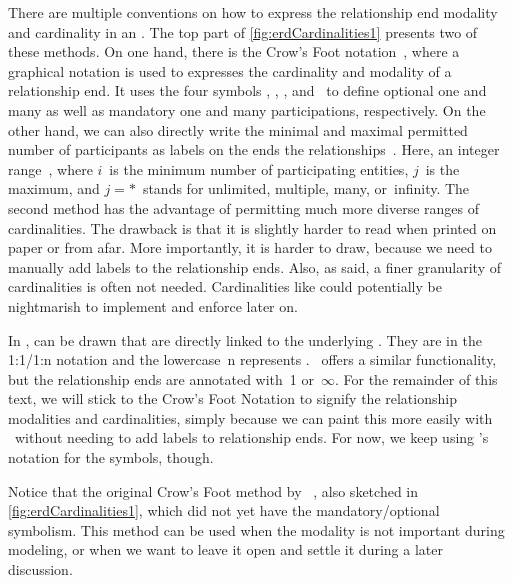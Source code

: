 There are multiple conventions on how to express the relationship end modality and cardinality in an .
The top part of \cref{fig:erdCardinalities1} presents two of these methods.
On one hand, there is the Crow's Foot notation~\cite{E1976BDSMEWACE,CM2000MDMAUDA,S2024D:CDMERDE}, where a graphical notation is used to expresses the cardinality and modality of a relationship end.
It uses the four symbols \crowsFootOptionalOne, \crowsFootOptionalMany, \crowsFootMandatoryOne, and \crowsFootMandatoryMany\ to define optional one and many as well as mandatory one and many participations, respectively.
On the other hand, we can also directly write the minimal and maximal permitted number of participants as labels on the ends the relationships~\cite{P2006CITRD:ERMI}.
Here, an integer range~, where $i$~is the minimum number of participating entities, $j$~is the maximum, and $j=*$~stands for unlimited, multiple, many, or~infinity.
The second method has the advantage of permitting much more diverse ranges of cardinalities.
The drawback is that it is slightly harder to read when printed on paper or from afar.
More importantly, it is harder to draw, because we need to manually add labels to the relationship ends.
Also, as said, a finer granularity of cardinalities is often not needed.
Cardinalities like  could potentially be nightmarish to implement and enforce later on.

In \libreofficeBase,  can be drawn that are directly linked to the underlying \db.
They are in the 1:1/1:n notation and the lowercase~n represents .
\microsoftAccess\ offers a similar functionality, but the relationship ends are annotated with~1 or~$\infty$.
For the remainder of this text, we will stick to the Crow's Foot Notation to signify the relationship modalities and cardinalities, simply because we can paint this more easily with \yEd\ without needing to add labels to relationship ends.
For now, we keep using \citeauthor{C1976TERMTAUVOD}'s notation for the symbols, though.

Notice that the original Crow's Foot method by \citeauthor{E1976BDSMEWACE}~\cite{E1976BDSMEWACE}, also sketched in \cref{fig:erdCardinalities1}, which did not yet have the mandatory/optional symbolism.
This method can be used when the modality is not important during modeling, or when we want to leave it open and settle it during a later discussion.

